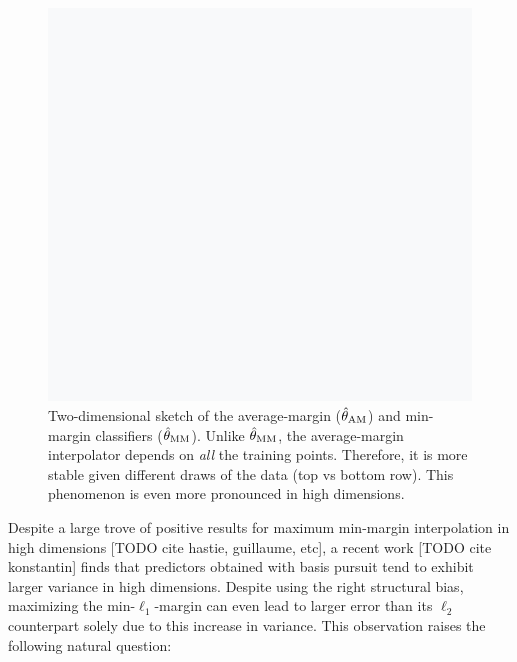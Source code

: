 \begin{figure}[t]
  \centering
  \includegraphics[width=\columnwidth]{figures/teaser_sketch.png}


  \caption{Two-dimensional sketch of the average-margin ($\hat{\theta}_{\mathrm{AM}}$) and min-margin
  classifiers ($\hat{\theta}_{\mathrm{MM}}$). Unlike $\hat{\theta}_{\mathrm{MM}}$, the average-margin interpolator depends on
\emph{all} the training points. Therefore, it is more stable given different
draws of the data (top vs bottom row). This phenomenon is even more pronounced
in high dimensions.}
\label{fig:teaser}

\end{figure}

Despite a large trove of positive results for maximum min-margin interpolation
in high dimensions [TODO cite hastie, guillaume, etc], a recent work [TODO cite
konstantin] finds that predictors obtained with basis pursuit tend to exhibit
larger variance in high dimensions. Despite using the right structural bias,
maximizing the min-$\ell_1$-margin can even lead to larger error than its
$\ell_2$ counterpart solely due to this increase in variance. This observation
raises the following natural question:

